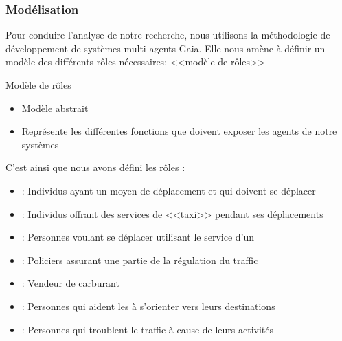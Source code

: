 \begin{frame}
    \frametitle{Modélisation}
    Pour conduire l'analyse de notre recherche, nous utilisons la méthodologie de développement de systèmes multi-agents Gaia.
    Elle nous amène à définir un modèle des différents rôles nécessaires: <<modèle de rôles>>
    \begin{block}{Modèle de rôles}
        \begin{itemize}
            \item Modèle abstrait
            \item Représente les différentes fonctions que doivent exposer les agents de notre systèmes
        \end{itemize}
    \end{block}

    \pause{}
    C'est ainsi que nous avons défini les rôles :

    \begin{itemize}
        \item \rConducteur{}: Individus ayant un moyen de déplacement et qui doivent se déplacer
        \item \rTaxi{}: Individus offrant des services de <<taxi>> pendant ses déplacements
        \item \rPieton{}: Personnes voulant se déplacer utilisant le service d'un \rTaxi{}
        \item \rPolicier{}: Policiers assurant une partie de la régulation du traffic
        \item \rVCarburant{}: Vendeur de carburant
        \item \rGps{}: Personnes qui aident les \rConducteur{} à s'orienter vers leurs destinations
        \item \rPertubateur{}: Personnes qui troublent le traffic à cause de leurs activités
    \end{itemize}

%    
\end{frame}

